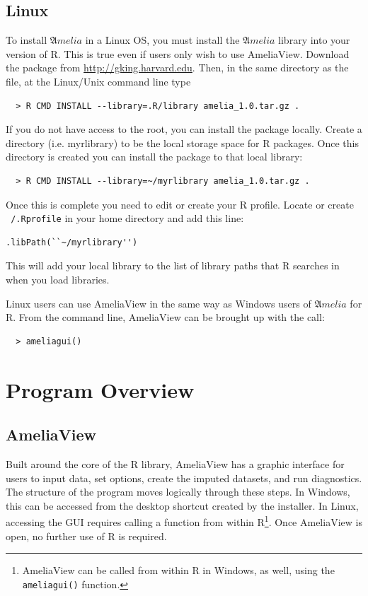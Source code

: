 \documentclass[12pt,titlepage]{article}
\newcommand{\Amelia}{\ensuremath{\mathfrak Amelia} }
\begin{document}
\subsection{Linux}
\label{sec:lin-install}
To install ${\mathfrak Amelia}$ in a Linux OS, you must install the ${\mathfrak Amelia}$ library into your version of R.  This is true even if users only wish to use AmeliaView.  Download the package from \url{http://gking.harvard.edu}.    Then, in the same directory as the file, at the Linux/Unix command line type
  \begin{verbatim}
  > R CMD INSTALL --library=.R/library amelia_1.0.tar.gz .
  \end{verbatim}
If you do not have access to the root, you can install the package locally.  Create a directory (i.e. myrlibrary) to be the local storage space for R packages.  Once this directory is created you can install the package to that local library:
  \begin{verbatim}
  > R CMD INSTALL --library=~/myrlibrary amelia_1.0.tar.gz .
  \end{verbatim}
Once this is complete you need to edit or create your R profile.  Locate or create \texttt{~/.Rprofile} in your home directory and add this line:
\begin{verbatim}
.libPath(``~/myrlibrary'')
\end{verbatim}
This will add your local library to the list of library paths that R searches in when you load libraries.  

Linux users can use AmeliaView in the same way as Windows users of \Amelia for R.  From the command line, AmeliaView can be brought up with the call:
  \begin{verbatim}
  > ameliagui()
  \end{verbatim}




\section{Program Overview}
\label{sec:overview}

\subsection{AmeliaView}
\label{sec:guioverview}
Built around the core of the R library, AmeliaView has a graphic interface for users to input data, set options, create the imputed datasets, and run diagnostics.  The structure of the program moves logically through these steps.  In Windows, this can be accessed from the desktop shortcut created by the installer.  In Linux, accessing the GUI requires calling a function from within R\footnote{AmeliaView can be called from within R in Windows, as well, using the \texttt{ameliagui()} function.}.  Once AmeliaView is open, no further use of R is required. 
\end{document}

